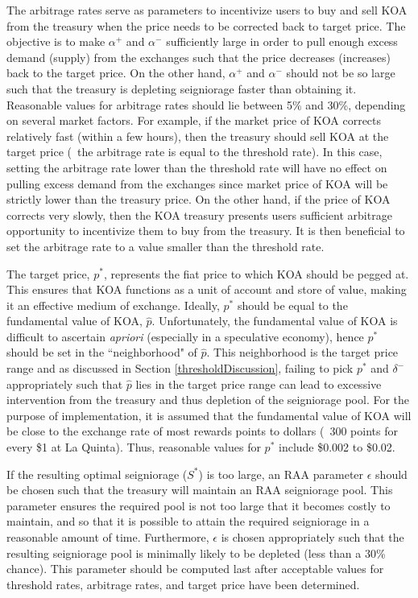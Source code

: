 The arbitrage rates serve as parameters to incentivize users to buy and sell KOA from the treasury when the price needs to be corrected back to target price. The objective is to make $\alpha^+$ and $\alpha^-$ sufficiently large in order to pull enough excess demand (supply) from the exchanges such that the price decreases (increases) back to the target price. On the other hand, $\alpha^+$ and $\alpha^-$ should not be so large such that the treasury is depleting seigniorage faster than obtaining it. Reasonable values for arbitrage rates should lie between 5\% and 30\%, depending on several market factors. For example, if the market price of KOA corrects relatively fast (within a few hours), then the treasury should sell KOA at the target price (\ie\ the arbitrage rate is equal to the threshold rate). In this case, setting the arbitrage rate lower than the threshold rate will have no effect on pulling excess demand from the exchanges since market price of KOA will be strictly lower than the treasury price. On the other hand, if the price of KOA corrects very slowly, then the KOA treasury presents users sufficient arbitrage opportunity to incentivize them to buy from the treasury. It is then beneficial to set the arbitrage rate to a value smaller than the threshold rate.

The target price, $p^*$, represents the fiat price to which KOA should be pegged at. This ensures that KOA functions as a unit of account and store of value, making it an effective medium of exchange. Ideally, $p^*$ should be equal to the fundamental value of KOA, $\hat{p}$. Unfortunately, the fundamental value of KOA is difficult to ascertain \textit{apriori} (especially in a speculative economy), hence $p^*$ should be set in the ``neighborhood" of $\hat{p}$. This neighborhood is the target price range and as discussed in Section \ref{thresholdDiscussion}, failing to pick $p^*$ and $\delta^-$ appropriately such that $\hat{p}$ lies in the target price range can lead to excessive intervention from the treasury and thus depletion of the seigniorage pool. For the purpose of implementation, it is assumed that the fundamental value of KOA will be close to the exchange rate of most rewards points to dollars (\eg\ 300 points for every \$1 at La Quinta). Thus, reasonable values for $p^*$ include \$0.002 to \$0.02. 

If the resulting optimal seigniorage ($S^*$) is too large, an RAA parameter $\epsilon$ should be chosen such that the treasury will maintain an RAA seigniorage pool. This parameter ensures the required pool is not too large that it becomes costly to maintain, and so that it is possible to attain the required seigniorage in a reasonable amount of time. Furthermore, $\epsilon$ is chosen appropriately such that the resulting seigniorage pool is minimally likely to be depleted (less than a 30\% chance). This parameter should be computed last after acceptable values for threshold rates, arbitrage rates, and target price have been determined.

